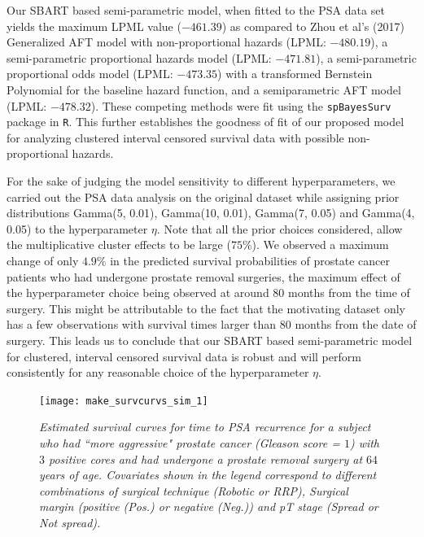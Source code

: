 \documentclass[11pt]{article}
\begin{document}
\color{red} 
Our SBART based semi-parametric model, when fitted to the PSA data set yields the maximum LPML value ($-461.39$) as compared to Zhou et al's (2017) Generalized AFT model with non-proportional hazards (LPML: $-480.19$), a semi-parametric proportional hazards model (LPML: $-471.81$), a semi-parametric proportional odds model (LPML: $-473.35$) with a transformed Bernstein Polynomial for the baseline hazard function, and a semiparametric AFT model (LPML: $-478.32$). These competing methods were fit using the \texttt{spBayesSurv} package in \texttt{R}. This further establishes the goodness of fit of our proposed model for analyzing clustered interval censored survival data with possible non-proportional hazards. 
\normalcolor

\color{red}
For the sake of judging the model sensitivity to different hyperparameters, we carried out the PSA data analysis on the original dataset while assigning prior distributions Gamma(5, 0.01), Gamma(10, 0.01), Gamma(7, 0.05) and Gamma(4, 0.05) to the hyperparameter $\eta.$ Note that all the prior choices considered, allow the multiplicative cluster effects to be large ($75\%$). We observed a maximum change of only $4.9\%$ in the predicted survival probabilities of prostate cancer patients who had undergone prostate removal surgeries, the maximum effect of the hyperparameter choice being observed at around 80 months from the time of surgery. This might be attributable to the fact that the motivating dataset only has a few observations with survival times larger than 80 months from the date of surgery. This leads us to conclude that our SBART based semi-parametric model for clustered, interval censored survival data is robust and will perform consistently for any reasonable choice of the hyperparameter $\eta.$
\normalcolor

\begin{figure}[t]
	\centering
	\vspace{0.1in}
    \texttt{[image: make\_survcurvs\_sim\_1]}
	\caption{\textit{Estimated survival curves for time to PSA recurrence for a subject who had ``more aggressive" prostate cancer (Gleason score = $1$) with $3$ positive cores and had undergone a prostate removal surgery at $64$ years of age. Covariates shown in the legend correspond to different combinations of surgical technique (Robotic or RRP), Surgical margin (positive (Pos.) or negative (Neg.)) and pT stage (Spread or Not spread).} \label{fig:smoothing}}
\end{figure}
\end{document}
